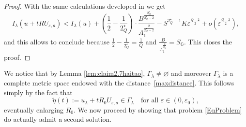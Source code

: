 \documentclass[11pt]{amsart}
\numberwithin{equation}{section} %
\theoremstyle{definition}
\def\G{\mathbb{G}}
\newcommand{\m}{\mbox}
\begin{document}
\begin{proof}
With the same calculations developed in \cite{BiGaVe}
we get
%
%
\[
I_\lambda(u+tRU_{\varepsilon,a})<I_\lambda(u)+\left(\frac{1}{2}-\frac{1}{2^\star_Q}\right)\cdot \frac{B^{\frac{2^\star_Q}{2^\star_Q -2}}}{A_1^{\frac{2}{2^\star_Q -2}}}-S^{2^\star_Q -1}K\varepsilon^{\frac{Q-2}{2}}
+o\left(\varepsilon^{\frac{Q-2}{2}}\right),
\]
and this allows to conclude because $\frac{1}{2}-\frac{1}{2^\star_Q}=\frac{1}{Q}$
and $\frac{B}{A_1^\frac{2}{2^\star_Q}}=S_{\G}$. This closes the proof.
\end{proof}

We notice that by Lemma \ref{lem:claim2.7haitao}, $\Gamma_\lambda\neq \varnothing$ and moreover $\Gamma_\lambda$ is a complete metric space endowed
with the distance~\eqref{maxdistance}. This follows simply by the fact that
\begin{equation}\label{eq:eta}
	\widetilde \eta(t) := u_\lambda+tR_0U_{\varepsilon,a}\in \Gamma_\lambda\quad\text{for all $\varepsilon\in (0,\varepsilon_0)$},
\end{equation}
\noindent eventually enlarging $R_0$.
We now proceed by showing that problem \eqref{EqProblem} do actually admit a second solution.
\end{document}

